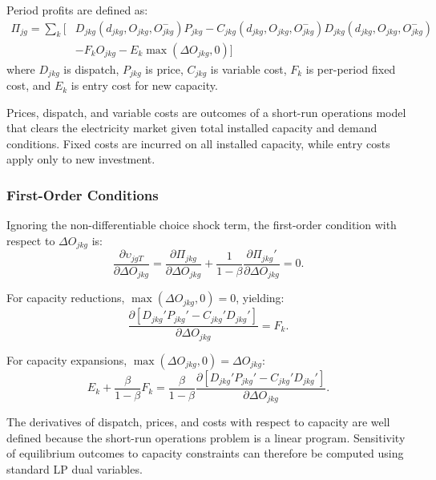 \documentclass[12pt]{article}
\begin{document}
Period profits are defined as:
\begin{equation}\label{eq:profits}
\begin{split}
    \Pi_{jg} = \sum_k \Big[ & D_{jkg}(d_{jkg}, O_{jkg}, O_{jkg}^-) P_{jkg} - C_{jkg}(d_{jkg}, O_{jkg}, O_{jkg}^-) D_{jkg}(d_{jkg}, O_{jkg}, O_{jkg}^-) \\
    & - F_k O_{jkg} - E_k \max(\Delta O_{jkg}, 0) \Big]
\end{split}
\end{equation}
where $D_{jkg}$ is dispatch, $P_{jkg}$ is price, $C_{jkg}$ is variable cost, $F_k$ is per-period fixed cost, and $E_k$ is entry cost for new capacity.

Prices, dispatch, and variable costs are outcomes of a short-run operations model that clears the electricity market given total installed capacity and demand conditions. Fixed costs are incurred on all installed capacity, while entry costs apply only to new investment.

\subsubsection{First-Order Conditions}\label{subsec:foc}

Ignoring the non-differentiable choice shock term, the first-order condition with respect to $\Delta O_{jkg}$ is:
\begin{equation}\label{eq:foc_longrun}
\frac{\partial \upsilon_{jgT}}{\partial \Delta O_{jkg}}
= \frac{\partial \Pi_{jkg}}{\partial \Delta O_{jkg}}
+ \frac{1}{1-\beta} \frac{\partial \Pi_{jkg}'}{\partial \Delta O_{jkg}}
= 0.
\end{equation}

For capacity reductions, $\max(\Delta O_{jkg},0)=0$, yielding:
\begin{equation}\label{eq:reducing_capacity}
\frac{\partial \left[ D_{jkg}' P_{jkg}' - C_{jkg}' D_{jkg}' \right]}{\partial \Delta O_{jkg}} = F_k.
\end{equation}

For capacity expansions, $\max(\Delta O_{jkg},0)=\Delta O_{jkg}$:
\begin{equation}\label{eq:increasing_capacity}
E_k + \frac{\beta}{1-\beta} F_k
= \frac{\beta}{1-\beta}
\frac{\partial \left[ D_{jkg}' P_{jkg}' - C_{jkg}' D_{jkg}' \right]}{\partial \Delta O_{jkg}}.
\end{equation}

The derivatives of dispatch, prices, and costs with respect to capacity are well defined because the short-run operations problem is a linear program. Sensitivity of equilibrium outcomes to capacity constraints can therefore be computed using standard LP dual variables.
\end{document}
